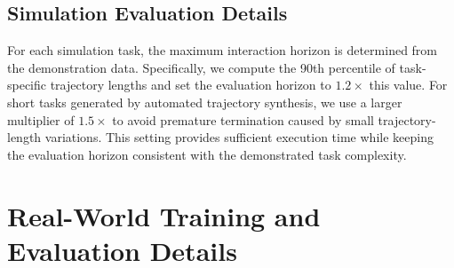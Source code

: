 \begin{table}[h]
\centering
\caption{\textbf{Simulation training data statistics.} The simulation training set contains 1,859,602 frames from 3,500 trajectories, corresponding to 20.66 hours of bimanual manipulation data at 25\,Hz. The Open dimension is excluded from the training set and used only to evaluate skill recombination and transfer to unseen task specifications. DLC denotes an auxiliary domain-randomized task used to broaden visual exposure during training.}
\label{tab:sim_training_data_statistics}
\small
\setlength{\tabcolsep}{4pt}
\end{table}

\subsection{Simulation Evaluation Details}
\label{appendix:sim_evaluation_setting}

For each simulation task, the maximum interaction horizon is determined from the demonstration data. Specifically, we compute the 90th percentile of task-specific trajectory lengths and set the evaluation horizon to $1.2\times$ this value. For short tasks generated by automated trajectory synthesis, we use a larger multiplier of $1.5\times$ to avoid premature termination caused by small trajectory-length variations. This setting provides sufficient execution time while keeping the evaluation horizon consistent with the demonstrated task complexity.

\section{Real-World Training and Evaluation Details}

